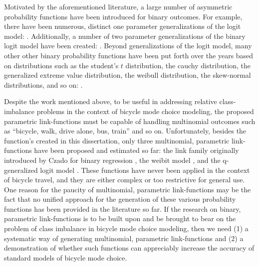 Motivated by the aforementioned literature, a large number of asymmetric probability functions have been introduced for binary outcomes. For example, there have been numerous, distinct one parameter generalizations of the logit model: \citep{aranda-ordaz_two_1981, guerrero_use_1982, czado_link_1992, nagler_scobit:_1994, chen_new_1999, masnadi-shirazi_variable_2010, nakayama_unified_2015, komori_asymmetric_2015}. Additionally, a number of two parameter generalizations of the binary logit model have been created: \citep{prentice_generalization_1976, pregibon_goodness_1980, stukel_generalized_1988, czado_parametric_1994, vijverberg_betit:_2000, vijverberg_pregibit:_2012}. Beyond generalizations of the logit model, many other other binary probability functions have been put forth over the years based on distributions such as the student's $t$ distribution, the cauchy distribution, the generalized extreme value distribution, the weibull distribution, the skew-normal distributions, and so on: \citep{kim_binary_2002, liu_robit_2004, castillo_closed_2008, kim_flexible_2008, koenker_parametric_2009, wang_generalized_2010, li_multinomial_2011, jiang_new_2013}. 

Despite the work mentioned above, to be useful in addressing relative class-imbalance problems in the context of bicycle mode choice modeling, the proposed parametric link-functions must be capable of handling multinomial outcomes such as ``bicycle, walk, drive alone, bus, train'' and so on. Unfortunately, besides the function's created in this dissertation, only three multinomial, parametric link-functions have been proposed and estimated so far:  the link family originally introduced by Czado for binary regression \citep{das_generalized_2014}, the weibit model \citep{castillo_closed_2008, fosgerau_discrete_2009}, and the q-generalized logit model \citep{nakayama_unified_2015}. These functions have never been applied in the context of bicycle travel, and they are either complex or too restrictive for general use. One reason for the paucity of multinomial, parametric link-functions may be the fact that no unified approach for the generation of these various probability functions has been provided in the literature so far. If the research on binary, parametric link-functions is to be built upon and be brought to bear on the problem of class imbalance in bicycle mode choice modeling, then we need (1) a systematic way of generating multinomial, parametric link-functions and (2) a demonstration of whether such functions can appreciably increase the accuracy of standard models of bicycle mode choice.

